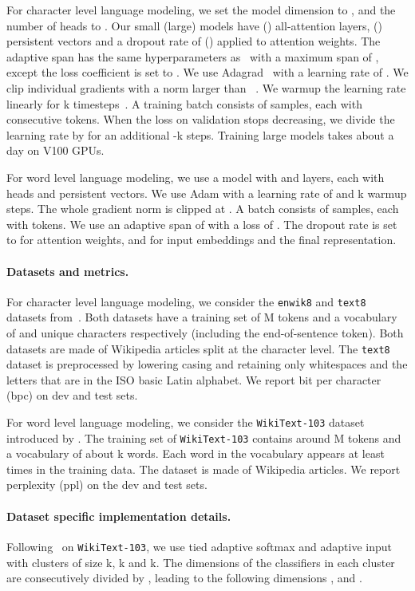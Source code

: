\documentclass{article}
\begin{document}
For character level language modeling, we set the model dimension to , and the number of heads to .
Our small (large) models have  () all-attention layers,  () persistent vectors and a dropout rate of  () applied to attention weights.
The adaptive span has the same hyperparameters as~\citet{sukhbaatar2019adaptive} with a maximum span of , except the loss coefficient is set to .
We use Adagrad~\cite{duchi2011adaptive} with a learning rate of .
We clip individual gradients with a norm larger than ~\cite{pascanu2013difficulty}.
We warmup the learning rate linearly for k timesteps~\cite{vaswani2017attention}.
A training batch consists of  samples, each with  consecutive tokens.
When the loss on validation stops decreasing, we divide the learning rate by  for an additional -k steps.
Training large models takes about a day on  V100 GPUs.

For word level language modeling, we use a model with  and  layers, each with  heads and  persistent vectors.
We use Adam with a learning rate of  and k warmup steps. The whole gradient norm is clipped at . A batch consists of  samples, each with  tokens.
We use an adaptive span of  with a loss of . The dropout rate is set to  for attention weights, and  for input embeddings and the final representation.

\paragraph{Datasets and metrics.}
For character level language modeling, we consider the \texttt{enwik8} and \texttt{text8} datasets from~\citet{mahoney2011large}.
Both datasets have a training set of M tokens and a vocabulary of  and  unique characters respectively (including the end-of-sentence token).
Both datasets are made of Wikipedia articles split at the character level.
The \texttt{text8} dataset is preprocessed by lowering casing and retaining only whitespaces and the letters that are in the ISO basic Latin alphabet.
We report bit per character (bpc) on dev and test sets.

For word level language modeling, we consider the \texttt{WikiText-103} dataset introduced by \citet{merity2016pointer}.
The training set of \texttt{WikiText-103} contains around M tokens and a vocabulary of about k words.
Each word in the vocabulary appears at least  times in the training data.
The dataset is made of Wikipedia articles.
We report perplexity (ppl) on the dev and test sets.

\paragraph{Dataset specific implementation details.}
Following~\citet{baevski2018adaptive} on \texttt{WikiText-103}, we use tied adaptive softmax and adaptive input with  clusters of size k, k and k.
The dimensions of the classifiers in each cluster are consecutively divided by , leading to the following dimensions ,  and .
\end{document}
